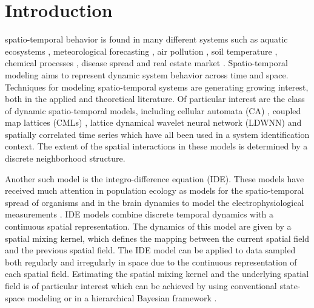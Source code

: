 \documentclass[10pt,twocolumn,twoside]{IEEEtran}
\begin{document}
%
\IEEEpeerreviewmaketitle



\section{Introduction}
 spatio-temporal behavior is found in many different systems such as aquatic ecosystems \cite{Schofield2002}, meteorological forecasting \cite{Xu2005}, air pollution \cite{Romanowicz2006}, soil temperature  \cite{Bond-Lamberty2005}, chemical processes \cite{Deng2005}, disease spread \cite{Kuo2009} and real estate market \cite{Sun2005}. Spatio-temporal modeling aims to represent dynamic system behavior across time and space. 
Techniques for modeling spatio-temporal systems are generating growing interest, both in the applied and theoretical literature. Of particular interest are the class of dynamic spatio-temporal models, including cellular automata (CA) \cite{Wolfram1994}, coupled map lattices (CMLs) \cite{Billings2002}, lattice dynamical wavelet neural network (LDWNN) \cite{Wei2009} and spatially correlated time series  \cite{Pfeifer1980,Glasbey2008,Dewar2007} which have all been used in a system identification context. The extent of the spatial interactions in these models is determined by a discrete neighborhood structure.


Another such model is the integro-difference equation (IDE). These models have received much attention in population ecology as models for the spatio-temporal spread of organisms \cite{Kot1992,Kot1996} and in the brain dynamics to model the electrophysiological measurements \cite{Deco2008,Schiff2008,Freestone2011}. IDE models combine discrete temporal dynamics with a continuous spatial representation. The dynamics of this model are given by a spatial mixing kernel, which defines the mapping between the current spatial field and the previous spatial field. The IDE model can be applied to data sampled both regularly and irregularly in space due to the continuous representation of each spatial field. Estimating the spatial mixing kernel and the underlying spatial field is of particular interest which can be achieved by  using conventional state-space modeling \cite{Dewar2009,Scerri2009} or in a hierarchical Bayesian framework \cite{Wikle1999,Xu2005,Wikle2011}. 
\end{document}
